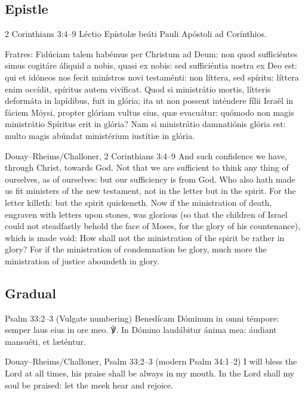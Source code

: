 \elementguard
\subsection*{Epistle }
\begin{appointedlatin}{2 Corinthians 3:4--9}
Léctio Epístolæ beáti Pauli Apóstoli ad Corínthios.

Fratres: Fidúciam talem habémus per Christum ad Deum: non quod sufficiéntes
simus cogitáre áliquid a nobis, quasi ex nobis: sed sufficiéntia nostra ex Deo
est: qui et idóneos nos fecit minístros novi testaménti: non líttera, sed
spíritu: líttera enim occídit, spíritus autem vivíficat. Quod si ministrátio
mortis, lítteris deformáta in lapídibus, fuit in glória; ita ut non possent
inténdere fílii Israël in fáciem Móysi, propter glóriam vultus eius, quæ
evacuátur: quómodo non magis ministrátio Spíritus erit in glória? Nam si
ministrátio damnatiónis glória est: multo magis abúndat ministérium iustítiæ
in glória.
\end{appointedlatin}
\begin{namedtranslation}{Douay--Rheims/Challoner, 2 Corinthians 3:4--9}
And such confidence we have, through Christ, towards God. Not that we are
sufficient to think any thing of ourselves, as of ourselves: but our
sufficiency is from God. Who also hath made us fit ministers of the new
testament, not in the letter but in the spirit. For the letter killeth: but the
spirit quickeneth. Now if the ministration of death, engraven with letters upon
stones, was glorious (so that the children of Israel could not steadfastly
behold the face of Moses, for the glory of his countenance), which is made
void: How shall not the ministration of the spirit be rather in glory? For if
the ministration of condemnation be glory, much more the ministration of
justice aboundeth in glory.
\end{namedtranslation}

\elementguard
\subsection*{Gradual }
\begin{appointedlatin}{Psalm 33:2--3 (Vulgate numbering)}
Benedícam Dóminum in omni témpore: semper laus eius in ore meo. ℣. In Dómino
laudábitur ánima mea: áudiant mansuéti, et læténtur.
\end{appointedlatin}
\begin{namedtranslation}{Douay--Rheims/Challoner, Psalm 33:2--3 (modern Psalm 34:1--2)}
I will bless the Lord at all times, his praise shall be always in my mouth. In
the Lord shall my soul be praised: let the meek hear and rejoice.
\end{namedtranslation}


